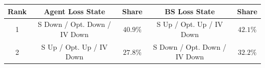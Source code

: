 \begingroup
\renewcommand{\arraystretch}{1.14}
\setlength{\tabcolsep}{5.5pt}
\begin{tabular}{@{}ccccc@{}}
\toprule
Rank & Agent Loss State & Share & BS Loss State & Share \\
\midrule
1 & S Down / Opt. Down / IV Down & $40.9$\% & S Up / Opt. Up / IV Down & $42.1$\% \\
2 & S Up / Opt. Up / IV Down & $27.8$\% & S Down / Opt. Down / IV Down & $32.2$\% \\
\bottomrule
\end{tabular}
\endgroup
